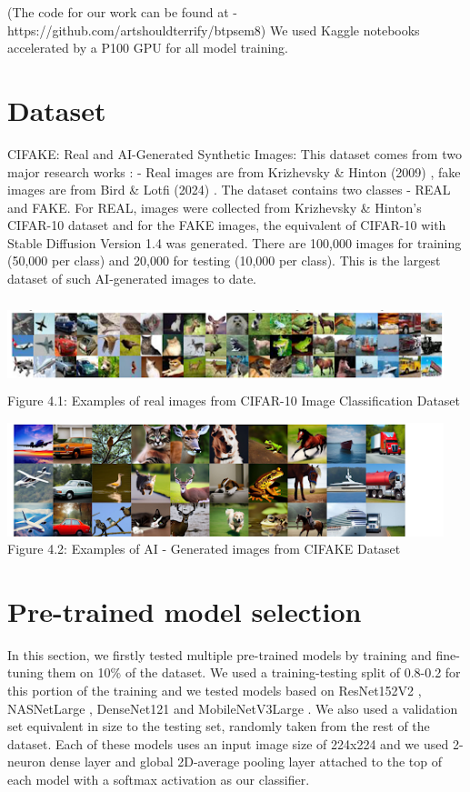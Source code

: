 
\fontsize{12pt}{24pt}\selectfont  (The code for our work can be found at - https://github.com/artshouldterrify/btpsem8)
We used Kaggle notebooks accelerated by a P100 GPU for all model training. 

\section{Dataset}
CIFAKE: Real and AI-Generated Synthetic Images: This dataset comes from two major research works : - Real images are from Krizhevsky \& Hinton (2009)  \cite{7} , fake images are from Bird \& Lotfi (2024)  \cite{6}.  The dataset contains two classes - REAL and FAKE. For REAL, images were collected from Krizhevsky \& Hinton's CIFAR-10 dataset and for the FAKE images, the equivalent of CIFAR-10 with Stable Diffusion Version 1.4 was generated. There are 100,000 images for training (50,000 per class) and 20,000 for testing (10,000 per class). This is the largest dataset of such AI-generated images to date.

\begin{center}
   \includegraphics[width=5in,height=1in]{images/4.1.png} 
   \\\fontsize{11pt}{24pt} Figure 4.1: Examples of real images from CIFAR-10 Image Classification Dataset

\end{center}


\begin{center}
   \includegraphics[width=5in]{images/4.2.png} 
   \\\fontsize{11pt}{24pt} Figure 4.2: Examples of AI - Generated images from CIFAKE Dataset
\end{center}



\section{Pre-trained model selection}
In this section, we firstly tested multiple pre-trained models by training and fine-tuning them on 10\% of the dataset. We used a training-testing split of 0.8-0.2 for this portion of the training and we tested models based on ResNet152V2  \cite{19}, NASNetLarge  \cite{25}, DenseNet121  \cite{21} and MobileNetV3Large \cite{28}. We also used a validation set equivalent in size to the testing set, randomly taken from the rest of the dataset. Each of these models uses an input image size of 224x224 and we used 2-neuron dense layer and global 2D-average pooling layer attached to the top of each model with a softmax activation as our classifier. 


